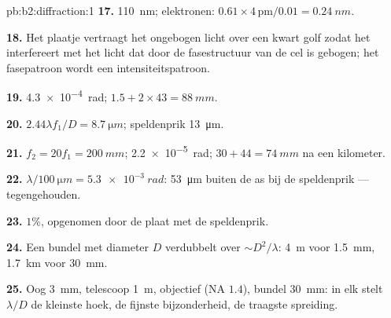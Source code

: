\begin{solution}{pb:b2:diffraction:1}
\textbf{17.} \qty{110}{nm}; elektronen:
$0.61 \times 4\,\text{pm}/0.01 = \qty{0.24}{nm}$.

\textbf{18.} Het plaatje vertraagt het ongebogen licht over een kwart golf
zodat het interfereert met het licht dat door de fasestructuur van de cel
is gebogen; het fasepatroon wordt een intensiteitspatroon.

\textbf{19.} \qty{4.3e-4}{rad}; $1.5 + 2 \times 43 = \qty{88}{mm}$.

\textbf{20.} $2.44\lambda f_1/D = \qty{8.7}{\micro m}$; speldenprik
\qty{13}{\micro m}.

\textbf{21.} $f_2 = 20f_1 = \qty{200}{mm}$; \qty{2.2e-5}{rad};
$30 + 44 = \qty{74}{mm}$ na een
kilometer.

\textbf{22.} $\lambda/\qty{100}{\micro m} = \qty{5.3e-3}{rad}$:
\qty{53}{\micro m} buiten de as bij de
speldenprik --- tegengehouden.

\textbf{23.} $1\%$, opgenomen door de plaat met de speldenprik.

\textbf{24.} Een bundel met diameter $D$ verdubbelt over $\sim D^2/\lambda$:
\qty{4}{m} voor
\qty{1.5}{mm}, \qty{1.7}{km} voor \qty{30}{mm}.

\textbf{25.} Oog \qty{3}{mm}, telescoop \qty{1}{m}, objectief (NA $1.4$), bundel
\qty{30}{mm}: in elk stelt $\lambda/D$ de kleinste hoek, de fijnste
bijzonderheid, de
traagste spreiding.
\end{solution}
